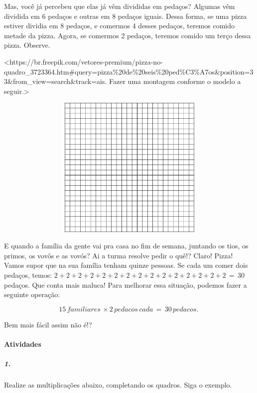Mas, você já percebeu que elas já vêm divididas em pedaços? Algumas vêm
dividida em 6 pedaços e outras em 8 pedaços iguais. Dessa forma, se uma
pizza estiver dividia em 8 pedaços, e comermos 4 desses pedaços, teremos
comido metade da pizza. Agora, se comermos 2 pedaços, teremos comido um
terço dessa pizza. Observe.

\textless{}https://br.freepik.com/vetores-premium/pizza-no-quadro\_3723364.htm\#query=pizza\%20de\%20seis\%20ped\%C3\%A7os\&position=33\&from\_view=search\&track=ais.
Fazer uma montagem conforme o modelo a seguir.\textgreater{}

\includegraphics[width=6.03125in,height=2.70150in]{media/image99.png}

E quando a família da gente vai pra casa no fim de semana, juntando os
tios, os primos, os vovôs e as vovós? Ai a turma resolve pedir o quê!?
Claro! Pizza! Vamos supor que na sua família tenham quinze pessoas. Se
cada um comer dois pedaços, temos:
\(2 + 2 + 2 + 2 + 2 + 2 + 2 + 2 + 2 + 2 + 2 + 2 + 2 + 2 + 2\, = \, 30\ \)pedaços.
Que conta mais maluca! Para melhorar essa situação, podemos fazer a
seguinte operação:

\[15\, familiares\, \times 2\, pedacos\, cada\, = \, 30\, pedacos.\ \]

Bem mais fácil assim não é!?

\paragraph{Atividades }\label{atividades-7}

\subparagraph{1.}\label{section-89}

Realize as multiplicações abaixo, completando os quadros. Siga o
exemplo.

